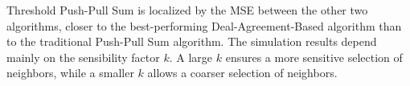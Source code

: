 Threshold Push-Pull Sum is localized by the MSE between the other two algorithms, closer to the best-performing Deal-Agreement-Based algorithm than to the traditional Push-Pull Sum algorithm. The simulation results depend mainly on the sensibility factor $k$. A large $k$ ensures a more sensitive selection of neighbors, while a smaller $k$ allows a coarser selection of neighbors.